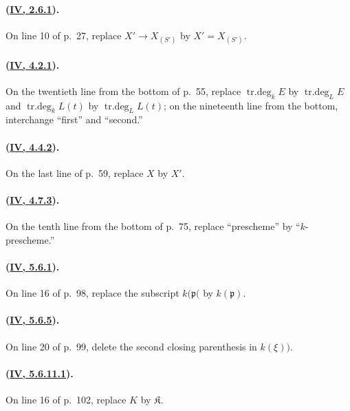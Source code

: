\paragraph{({\texorpdfstring{\protect\hyperlink{ega4.c04.prop.2-6-1}{IV, 2.6.1}}{IV, 2.6.1}}).}
On line 10 of p.~27, replace $X'\to X_{(S')}$ by $X'=X_{(S')}$.

\paragraph{({\texorpdfstring{\protect\hyperlink{ega4.c04.prop.4-2-1}{IV, 4.2.1}}{IV, 4.2.1}}).}
On the twentieth line from the bottom of p.~55, replace
$\operatorname{tr.deg}_kE$ by $\operatorname{tr.deg}_LE$ and
$\operatorname{tr.deg}_kL(t)$ by $\operatorname{tr.deg}_LL(t)$; on the
nineteenth line from the bottom, interchange ``first'' and ``second.''

\paragraph{({\texorpdfstring{\protect\hyperlink{ega4.c04.lem.4-4-2}{IV, 4.4.2}}{IV, 4.4.2}}).}
On the last line of p.~59, replace $X$ by $X'$.

\paragraph{({\texorpdfstring{\protect\hyperlink{ega4.c04.prop.4-7-3}{IV, 4.7.3}}{IV, 4.7.3}}).}
On the tenth line from the bottom of p.~75, replace ``prescheme'' by
``$k$-prescheme.''

\paragraph{({\texorpdfstring{\protect\hyperlink{ega4.c04.prop.5-6-1}{IV, 5.6.1}}{IV, 5.6.1}}).}
On line 16 of p.~98, replace the subscript $k(\mathfrak p($ by
$k(\mathfrak p)$.

\paragraph{({\texorpdfstring{\protect\hyperlink{ega4.c04.prop.5-6-5}{IV, 5.6.5}}{IV, 5.6.5}}).}
On line 20 of p.~99, delete the second closing parenthesis in $k(\xi))$.

\paragraph{({\texorpdfstring{\protect\hyperlink{ega4.c04.lem.5-6-11-1}{IV, 5.6.11.1}}{IV, 5.6.11.1}}).}
On line 16 of p.~102, replace $K$ by $\mathfrak K$.

